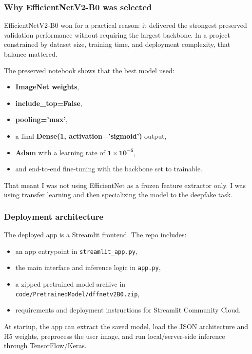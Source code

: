\documentclass[11pt]{article}
\begin{document}
\subsubsection{Why EfficientNetV2-B0 was selected}
EfficientNetV2-B0 won for a practical reason: it delivered the strongest preserved validation performance without requiring the largest backbone. In a project constrained by dataset size, training time, and deployment complexity, that balance mattered.

The preserved notebook shows that the best model used:
\begin{itemize}[leftmargin=1.5em]
    \item \textbf{ImageNet weights},
    \item \textbf{include\_top=False},
    \item \textbf{pooling='max'},
    \item a final \textbf{Dense(1, activation='sigmoid')} output,
    \item \textbf{Adam} with a learning rate of \(\mathbf{1 \times 10^{-5}}\),
    \item and end-to-end fine-tuning with the backbone set to trainable.
\end{itemize}

That meant I was not using EfficientNet as a frozen feature extractor only. I was using transfer learning and then specializing the model to the deepfake task.

\subsubsection{Deployment architecture}
The deployed app is a Streamlit frontend. The repo includes:
\begin{itemize}[leftmargin=1.5em]
    \item an app entrypoint in \texttt{streamlit\_app.py},
    \item the main interface and inference logic in \texttt{app.py},
    \item a zipped pretrained model archive in \texttt{code/PretrainedModel/dffnetv2B0.zip},
    \item requirements and deployment instructions for Streamlit Community Cloud.
\end{itemize}

At startup, the app can extract the saved model, load the JSON architecture and H5 weights, preprocess the user image, and run local/server-side inference through TensorFlow/Keras.
\end{document}
